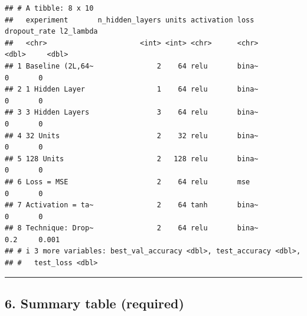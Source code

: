 \documentclass[
]{article}
\newenvironment{Shaded}{\begin{snugshade}}{\end{snugshade}}
\newcommand{\AttributeTok}[1]{\textcolor[rgb]{0.13,0.29,0.53}{#1}}
\newcommand{\FunctionTok}[1]{\textcolor[rgb]{0.13,0.29,0.53}{\textbf{#1}}}
\newcommand{\NormalTok}[1]{#1}
\newcommand{\OtherTok}[1]{\textcolor[rgb]{0.56,0.35,0.01}{#1}}
\newcommand{\SpecialCharTok}[1]{\textcolor[rgb]{0.81,0.36,0.00}{\textbf{#1}}}
\begin{document}
\begin{Shaded}
\end{Shaded}

\begin{verbatim}
## # A tibble: 8 x 10
##   experiment       n_hidden_layers units activation loss  dropout_rate l2_lambda
##   <chr>                      <int> <int> <chr>      <chr>        <dbl>     <dbl>
## 1 Baseline (2L,64~               2    64 relu       bina~          0       0    
## 2 1 Hidden Layer                 1    64 relu       bina~          0       0    
## 3 3 Hidden Layers                3    64 relu       bina~          0       0    
## 4 32 Units                       2    32 relu       bina~          0       0    
## 5 128 Units                      2   128 relu       bina~          0       0    
## 6 Loss = MSE                     2    64 relu       mse            0       0    
## 7 Activation = ta~               2    64 tanh       bina~          0       0    
## 8 Technique: Drop~               2    64 relu       bina~          0.2     0.001
## # i 3 more variables: best_val_accuracy <dbl>, test_accuracy <dbl>,
## #   test_loss <dbl>
\end{verbatim}

\begin{center}\rule{0.5\linewidth}{0.5pt}\end{center}

\subsection{6. Summary table (required)}\label{summary-table-required}
\end{document}

